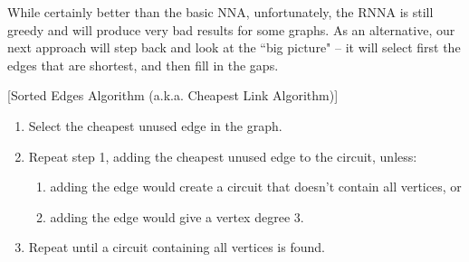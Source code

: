 While certainly better than the basic NNA, unfortunately, the RNNA is still greedy and will produce very bad results for some graphs.  As an alternative, our next approach will step back and look at the ``big picture" -- it will select first the edges that are shortest, and then fill in the gaps.

\begin{algorithm}{}{}[Sorted Edges Algorithm (a.k.a. Cheapest Link Algorithm)]
\hspace{3in}
\begin{enumerate}
\item Select the cheapest unused edge in the graph.
\item Repeat step 1, adding the cheapest unused edge to the circuit, unless:
\begin{enumerate}
\item adding the edge would create a circuit that doesn't contain all vertices, or
\item adding the edge would give a vertex degree 3.
\end{enumerate}
\item Repeat until a circuit containing all vertices is found.
\end{enumerate}
\end{algorithm}

